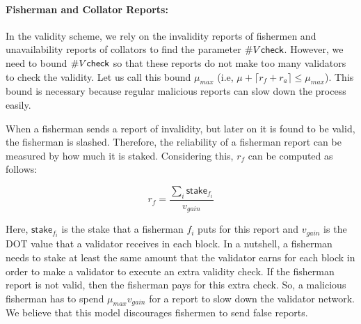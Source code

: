 \paragraph{Fisherman and Collator Reports:} In the validity scheme, we rely on the invalidity reports of fishermen and  unavailability reports of collators to find the parameter $ \#V\mathsf{check} $. However, we need to bound $\#V\mathsf{check}$ so that these reports do not make too many validators to check the validity. Let us call this bound $\mu_{max}$ (i.e, $\mu + \lceil r_f + r_a \rceil \leq \mu_{max}$). This bound is necessary because regular malicious reports can slow down the process easily. 

When a fisherman sends a report of invalidity, but later on it is found to be valid, the fisherman is slashed. Therefore, the reliability of a fisherman report can be measured by how much it is staked. 
Considering this, $r_f$ can be computed as follows:

$$r_f = \frac{\sum_{i}\mathsf{stake}_{f_i}}{v_{gain}}$$

Here, $\mathsf{stake}_{f_i}$ is the stake that a fisherman $f_i$ puts for this report and $v_{gain}$ is the DOT value that a validator receives in each block. In a nutshell, a fisherman needs to stake at least the same amount that the validator earns for each block in order to make a validator to execute an extra validity check. If the fisherman report is not valid, then the fisherman pays for this extra check. So, a malicious fisherman has to spend $\mu_{max} v_{gain}$ for a report to slow down the validator network. We believe that this model discourages fishermen to send false reports. 

